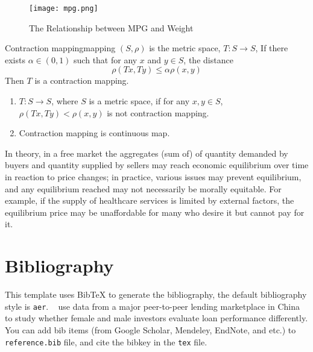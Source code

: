 \documentclass{elegantbook}
\begin{document}
\begin{figure}[!htbp]
	\centering
	\texttt{[image: mpg.png]}
	\caption{The Relationship between MPG and Weight\label{fig:mpg}}
\end{figure}

\begin{definition}{Contraction mapping}{mapping}
$(S,\rho)$ is the metric space, $T: S\to S$, If there exists $\alpha\in(0,1)$ such that for any $x$ and $y\in S$, the distance
\begin{equation}
\rho(Tx,Ty)\leq \alpha\rho(x,y)
\end{equation}
Then $T$ is a {\color{main} contraction mapping}.
\end{definition}

\begin{remark}
\begin{enumerate}[noitemsep]
\item $T:S\to S$, where $S$ is a metric space, if  for any $x,y\in S$, $\rho(Tx,Ty)<\rho(x,y)$ is not contraction mapping.
\item Contraction mapping is continuous map.
\end{enumerate}
\end{remark}


\begin{conclusion}
In theory, in a free market the aggregates (sum of) of quantity demanded by buyers and quantity supplied by sellers may reach economic equilibrium over time in reaction to price changes; in practice, various issues may prevent equilibrium, and any equilibrium reached may not necessarily be morally equitable. For example, if the supply of healthcare services is limited by external factors, the equilibrium price may be unaffordable for many who desire it but cannot pay for it.
\end{conclusion}

\section{Bibliography}
This template uses Bib\TeX{} to generate the bibliography, the default bibliography style is \verb|aer|. ~\cite{Chen2018} use data from a major peer-to-peer lending marketplace in China to study whether female and male investors evaluate loan performance differently. You can add bib items (from Google Scholar, Mendeley, EndNote, and etc.) to \verb|reference.bib| file, and cite the bibkey in the \verb|tex| file.


\nocite{EINAV2010,Havrylchyk2018} 




\end{document}
